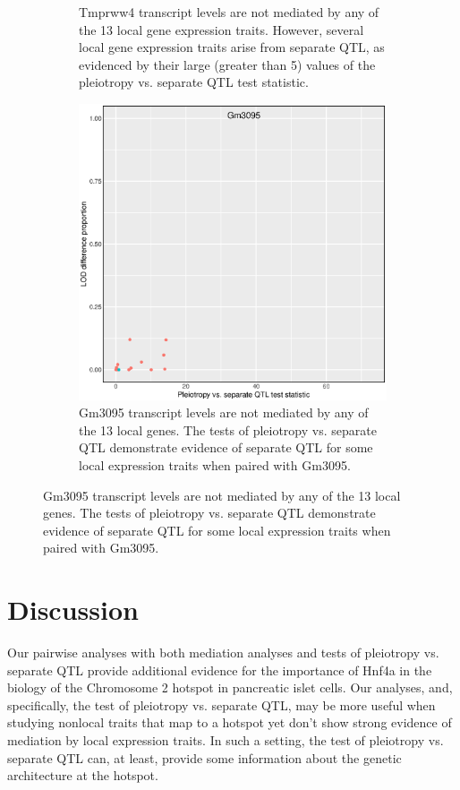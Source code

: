 \documentclass{article}
\begin{document}
\begin{figure}
\begin{subfigure}[t]{.45\textwidth}
        \caption{Tmprww4 transcript levels are not mediated by any of the 13 local gene expression traits. However, several local gene expression traits arise from separate QTL, as evidenced by their large (greater than 5) values of the pleiotropy vs. separate QTL test statistic.}
    \end{subfigure}
    \begin{subfigure}[t]{.45\textwidth}
        \includegraphics[width = \textwidth]{../Rmd/nonlocal-scatter_141.eps}
        \caption{Gm3095 transcript levels are not mediated by any of the 13 local genes. The tests of pleiotropy vs. separate QTL demonstrate evidence of separate QTL for some local expression traits when paired with Gm3095.}
    \end{subfigure}
    \label{fig:my_label}
\end{figure}





\section{Discussion}

Our pairwise analyses with both mediation analyses and tests of pleiotropy vs. separate QTL provide additional evidence for the importance of Hnf4a in the biology of the Chromosome 2 hotspot in pancreatic islet cells. Our analyses, and, specifically, the test of pleiotropy vs. separate QTL, may be more useful when studying nonlocal traits that map to a hotspot yet don't show strong evidence of mediation by local expression traits. In such a setting, the test of pleiotropy vs. separate QTL can, at least, provide some information about the genetic architecture at the hotspot. 
\end{document}
